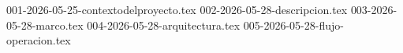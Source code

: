 \clearpage
{}
{001-2026-05-25-contextodelproyecto.tex}
{002-2026-05-28-descripcion.tex}
{003-2026-05-28-marco.tex}
{004-2026-05-28-arquitectura.tex}
{005-2026-05-28-flujo-operacion.tex}
